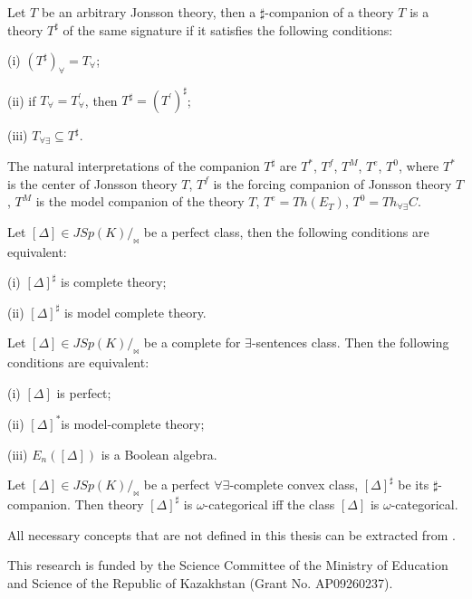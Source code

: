 \documentclass[bsl,meeting]{asl}
\begin{document}
\begin{definition} Let $T$ be an arbitrary Jonsson theory, then a $\sharp$-companion of a theory $T$ is
a theory $T^\sharp$ of the same signature if it satisfies the following conditions: 

(i) $(T^\sharp)_\forall= T_\forall$;

(ii) if $T_\forall=T^\prime_\forall$, then $T^\sharp=(T^\prime)^\sharp$;

(iii) $T_{\forall\exists}\subseteq T^\sharp$.
\end{definition}
The natural interpretations of the companion $T^\sharp$ are $T^*$, $T^f$, $T^M$, $T^e$, $T^0$, where $T^*$ is the center of Jonsson theory $T$, $T^f$ is the forcing companion of Jonsson theory $T$, $T^M$ is the model
companion of the theory $T$, $T^e=Th(E_T)$, $T^0=Th_{\forall\exists}C$.

\begin{theorem}
Let $[\Delta]\in JSp(K)/_{\bowtie}$ be a perfect class, then the following conditions are equivalent:

(i) $[\Delta]^\sharp$ is complete theory;

(ii) $[\Delta]^\sharp$ is model complete theory.
\end{theorem}
\begin{theorem}
Let $[\Delta]\in JSp(K)/_{\bowtie}$ be a complete for $\exists$-sentences class. Then the following
conditions are equivalent:

(i) $[\Delta]$ is perfect;

(ii) $[\Delta]^*$is model-complete theory;

(iii) $E_n([\Delta])$ is a Boolean algebra.
\end{theorem}

\begin{theorem}
Let $[\Delta]\in JSp(K)/_{\bowtie}$ be a perfect $\forall\exists$-complete convex class, $[\Delta]^\sharp$ be its $\sharp$-companion. Then theory $[\Delta]^\sharp$ is $\omega$-categorical iff the class $[\Delta]$ is $\omega$-categorical.
\end{theorem}

All necessary concepts that are not defined in this thesis can be extracted from \cite{1}.

This research is funded by the Science Committee of the Ministry of Education and Science of the Republic of Kazakhstan (Grant No. AP09260237).
\end{document}
